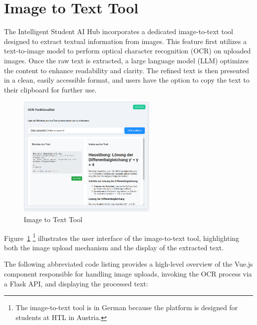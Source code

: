 \section{Image to Text Tool}

The Intelligent Student AI Hub incorporates a dedicated image-to-text tool designed to extract textual information from images. 
This feature first utilizes a text-to-image model to perform optical character recognition (OCR) on uploaded images. Once the raw text is extracted, 
a large language model (LLM) optimizes the content to enhance readability and clarity. The refined text is then presented in a clean, easily accessible format, 
and users have the option to copy the text to their clipboard for further use.

\begin{figure}
    \centering
    \includegraphics[width=0.6\textwidth]{figures/OCR-functonalatie.png}
    \caption{Image to Text Tool}
    \label{fig:image-to-text-tool}
\end{figure}

Figure~\ref{fig:image-to-text-tool} \footnote{The image-to-text tool is in German because the platform is designed for students at HTL in Austria.}
illustrates the user interface of the image-to-text tool, highlighting both the image upload mechanism and the display of the extracted text.

The following abbreviated code listing provides a high-level overview of the Vue.js component responsible for handling image uploads, invoking the OCR process via a Flask API, and displaying the processed text:

